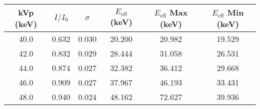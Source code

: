 \begin{tabular}{cccccc}
\toprule
 kVp (keV) &  $I/I_0$ &  $\sigma$ &  $E_{\text{eff}}$ (keV) &  $E_{\text{eff}}$ Max (keV) &  $E_{\text{eff}}$ Min (keV) \\
\midrule
      40.0 &               0.632 &                                  0.030 &                  20.200 &                      20.982 &                      19.529 \\
      42.0 &               0.832 &                                  0.029 &                  28.444 &                      31.058 &                      26.531 \\
      44.0 &               0.874 &                                  0.027 &                  32.382 &                      36.412 &                      29.668 \\
      46.0 &               0.909 &                                  0.027 &                  37.967 &                      46.193 &                      33.431 \\
      48.0 &               0.940 &                                  0.024 &                  48.162 &                      72.627 &                      39.936 \\
\bottomrule
\end{tabular}
